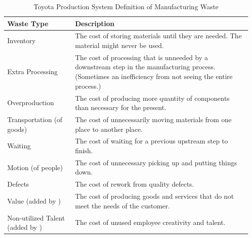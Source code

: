 \begin{table}[t]
\renewcommand{\arraystretch}{1.5}
\centering
\caption{Toyota Production System Definition of Manufacturing Waste}
\label{ManufacturingWaste}
\begin{tabular}{| >{\raggedright}m{1.15in}|p{2.00in}|}
\hline
Waste Type                & Description                                                                                                                                                  \\ \hline
Inventory                 & The cost of storing materials until they are needed. The material might never be used.                                                                   \\ \hline
Extra Processing          & The cost of processing that is unneeded by a downstream step in the manufacturing process. (Sometimes an inefficiency from not seeing the entire process.) \\ \hline
Overproduction            & The cost of producing more quantity of components than necessary for the present.                                                                            \\ \hline
Transportation (of goods) & The cost of unnecessarily moving materials from one place to another place.                                                                                  \\ \hline
Waiting                   & The cost of waiting for a previous upstream step to finish.                                                                                                       \\ \hline
Motion (of people)        & The cost of unnecessary picking up and putting things down.                                                                                                  \\ \hline
Defects                   & The cost of rework from quality defects.                                                                                                                     \\ \hline
Value (added by \cite{WomackLeanThinking})                     & The cost of producing goods and services that do not meet the needs of the customer.                                                                         \\ \hline
Non-utilized Talent (added by \cite{LikerToyotaWay})      & The cost of unused employee creativity and talent.                                                                                                           \\ \hline
\end{tabular}
\end{table}


